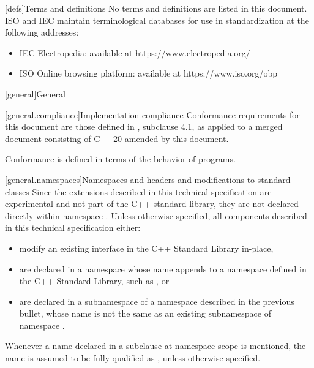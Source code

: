 [defs]{Terms and definitions}
\pnum
{}%
No terms and definitions are listed in this document. ISO and IEC maintain
terminological databases for use in standardization at the following addresses:

\begin{itemize}
    \item IEC Electropedia: available at https://www.electropedia.org/
    \item ISO Online browsing platform: available at https://www.iso.org/obp
\end{itemize}

[general]{General}

[general.compliance]{Implementation compliance}
\pnum
Conformance requirements for this document are those defined in {\cppstddocno}, subclause 4.1, as applied to a merged document consisting of C++20 amended by this document.
\begin{note}
Conformance is defined in terms of the behavior of programs.
\end{note}

[general.namespaces]{Namespaces and headers and modifications to standard classes}
\pnum
Since the extensions described in this technical specification are experimental and not part of the C++ standard library, they are not declared directly within namespace . Unless otherwise specified, all components described in this technical specification either:

\begin{itemize}
    \item modify an existing interface in the C++ Standard Library in-place,
    \item are declared in a namespace whose name appends  to a namespace defined in the C++ Standard Library, such as , or
    \item are declared in a subnamespace of a namespace described in the previous bullet, whose name is not the same as an existing subnamespace of namespace .
\end{itemize}

\pnum
Whenever a name  declared in a subclause at namespace scope
is mentioned, the name  is assumed to be fully qualified as
, unless otherwise specified.


